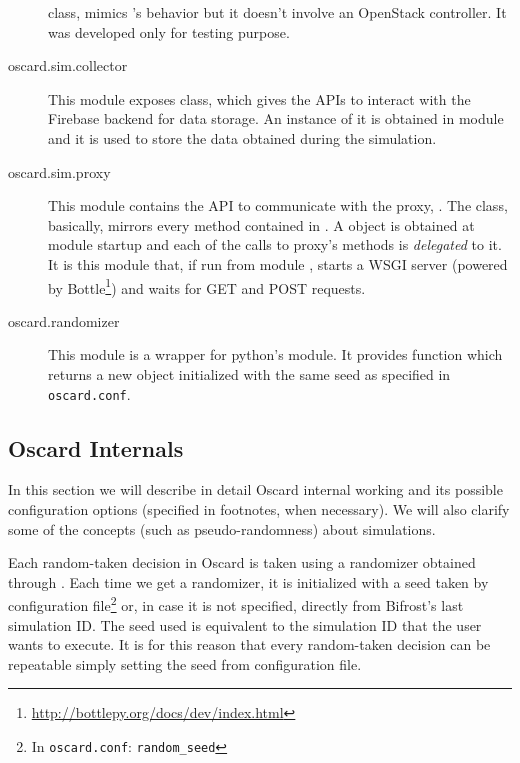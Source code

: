 \begin{description}
	 class, mimics 's behavior but it doesn't involve an OpenStack controller. It was developed only for testing purpose.
	\item[oscard.sim.collector] This module exposes  class, which gives the APIs to interact with the Firebase backend for data storage. An instance of it is obtained in  module and it is used to store the data obtained during the simulation.
	\item[oscard.sim.proxy] This module contains the API to communicate with the proxy, . The class, basically, mirrors every method contained in . A  object is obtained at module startup and each of the calls to proxy's methods is \textit{delegated} to it. It is this module that, if run from module , starts a WSGI server (powered by Bottle\footnote{\url{http://bottlepy.org/docs/dev/index.html}}) and waits for GET and POST requests.
	\item[oscard.randomizer] This module is a wrapper for python's  module. It provides  function which returns a new  object initialized with the same seed as specified in \texttt{oscard.conf}.
\end{description}

\subsection{Oscard Internals}
\label{sub:oscard_internals}
\newcommand{\osconf}[1]{\footnote{In \texttt{oscard.conf}: \texttt{#1}}}

In this section we will describe in detail Oscard internal working and its possible configuration options (specified in footnotes, when necessary). We will also clarify some of the concepts (such as pseudo-randomness) about simulations.

Each random-taken decision in Oscard is taken using a randomizer obtained through . Each time we get a randomizer, it is initialized with a seed taken by configuration file\osconf{random\_seed} or, in case it is not specified, directly from Bifrost's last simulation ID. The seed used is equivalent to the simulation ID that the user wants to execute. It is for this reason that every random-taken decision can be repeatable simply setting the seed from configuration file.

